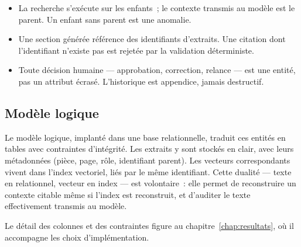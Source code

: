 \begin{itemize}
  \item {} La recherche s'exécute sur
        les enfants~; le contexte transmis au modèle est le parent. Un
        enfant sans parent est une anomalie.
  \item {} Une section
        générée référence des identifiants d'extraits. Une citation dont
        l'identifiant n'existe pas est rejetée par la validation
        déterministe.
  \item {} Toute décision humaine ---
        approbation, correction, relance --- est une entité, pas un
        attribut écrasé. L'historique est appendice, jamais destructif.
\end{itemize}

\subsection{Modèle logique}

Le modèle logique, implanté dans une base relationnelle, traduit ces
entités en tables avec contraintes d'intégrité. Les extraits y sont
stockés en clair, avec leurs métadonnées (pièce, page, rôle, identifiant
parent). Les vecteurs correspondants vivent dans l'index vectoriel, liés
par le même identifiant. Cette dualité --- texte en relationnel, vecteur
en index --- est volontaire~: elle permet de reconstruire un contexte
citable même si l'index est reconstruit, et d'auditer le texte effectivement
transmis au modèle.

Le détail des colonnes et des contraintes figure au
chapitre~\ref{chap:resultats}, où il accompagne les choix d'implémentation.
